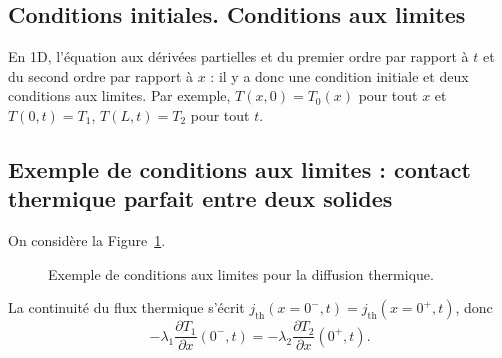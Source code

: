     \subsection{Conditions initiales. Conditions aux limites}

        En 1D, l'équation aux dérivées partielles et du premier ordre par rapport à $t$ et du second ordre par rapport à $x$ : il y a donc une condition initiale et deux conditions aux limites. Par exemple, $T(x,0)=T_0(x)$ pour tout $x$ et $T(0,t)=T_1$, $T(L,t)=T_2$ pour tout $t$.

    \subsection[Exemple de conditions aux limites]{Exemple de conditions aux limites : contact\texorpdfstring{\\}{ }thermique parfait entre deux solides}

        On considère la Figure~\ref{fig:contact_thermique_parfait_deux_solides}.

        \begin{figure}
            \centering
            \caption{Exemple de conditions aux limites pour la diffusion thermique.}    
            \label{fig:contact_thermique_parfait_deux_solides}
        \end{figure}

        La continuité du flux thermique s'écrit $j_{\text{th}}(x=0^{-},t)=j_{\text{th}}(x=0^{+},t)$, donc
        \begin{equation*}
            \boxed{
                -\lambda_1\frac{\partial T_1}{\partial x}(0^{-},t)=-\lambda_2\frac{\partial T_2}{\partial x}(0^{+},t).
            }
        \end{equation*}

